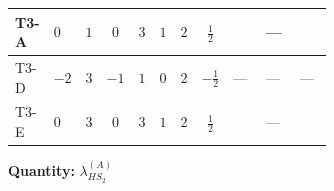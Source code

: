 \documentclass[8pt]{article}
\begin{document}
\begin{landscape}
\begin{longtable}{@{}llcccccc >{\raggedright\arraybackslash}p{0.21\linewidth} >{\raggedright\arraybackslash}p{0.21\linewidth} >{\raggedright\arraybackslash}p{0.21\linewidth}@{}}
\midrule
T3-A & $0$ & $1$ & $0$ & $3$ & $1$ & $2$ & $\frac{1}{2}$ & \scriptsize\adjustbox{max width=\linewidth}{$\begin{gathered} +2 {\lambda_{HS_2}^{(A)}} {\lambda_{S_2}^{(1)}}\end{gathered}$} & --- & \scriptsize\adjustbox{max width=\linewidth}{$\begin{gathered} {\lambda_{HS_2}^{(A)}} (2 T_{\nu}^{(2)}+6 \operatorname{Tr}\!\left({Y_d}\,\left({Y_d}\right)^{\dagger}\right)+2 \operatorname{Tr}\!\left({Y_e}\,\left({Y_e}\right)^{\dagger}\right)+6 \operatorname{Tr}\!\left({Y_u}\,\left({Y_u}\right)^{\dagger}\right)+16 {\lambda_{S_2}^{(A)}})\end{gathered}$} \\
\midrule
T3-D & $-2$ & $3$ & $-1$ & $1$ & $0$ & $2$ & $-\frac{1}{2}$ & --- & --- & --- \\
\midrule
T3-E & $0$ & $3$ & $0$ & $3$ & $1$ & $2$ & $\frac{1}{2}$ & \scriptsize\adjustbox{max width=\linewidth}{$\begin{gathered} +2 {\lambda_{HS_2}^{(A)}} {\lambda_{S_2}^{(1)}}\end{gathered}$} & --- & \scriptsize\adjustbox{max width=\linewidth}{$\begin{gathered} {\lambda_{HS_2}^{(A)}} (2 T_{\nu}^{(2)}+6 \operatorname{Tr}\!\left({Y_d}\,\left({Y_d}\right)^{\dagger}\right)+2 \operatorname{Tr}\!\left({Y_e}\,\left({Y_e}\right)^{\dagger}\right)+6 \operatorname{Tr}\!\left({Y_u}\,\left({Y_u}\right)^{\dagger}\right)+16 {\lambda_{S_2}^{(A)}})\end{gathered}$} \\
\midrule
\bottomrule
\end{longtable}
\clearpage
\noindent\textbf{Quantity: }$\lambda_{HS_2}^{(A)}$\par\smallskip

\end{landscape}
\end{document}
